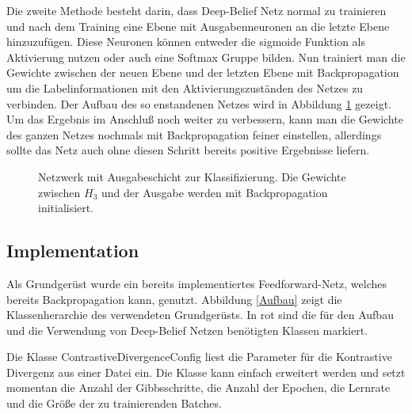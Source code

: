 \documentclass[12pt]{article}
\begin{document}
Die zweite Methode besteht darin, dass Deep-Belief Netz normal zu trainieren und nach dem Training eine Ebene mit Ausgabenneuronen an die letzte Ebene hinzuzufügen. Diese Neuronen können entweder die sigmoide Funktion als Aktivierung nutzen oder auch eine Softmax Gruppe bilden. Nun trainiert man die Gewichte zwischen der neuen Ebene und der letzten Ebene mit Backpropagation um die Labelinformationen mit den Aktivierungszuständen des Netzes zu verbinden. Der Aufbau des so enstandenen Netzes wird in Abbildung \ref{BPTrain} gezeigt. Um das Ergebnis im Anschluß noch weiter zu verbessern, kann man die Gewichte des ganzen Netzes nochmals mit Backpropagation feiner einstellen, allerdings sollte das Netz auch ohne diesen Schritt bereits positive Ergebnisse liefern\cite{backprop}.

\begin{figure}[H]
	\center
	
	\caption{Netzwerk mit Ausgabeschicht zur Klassifizierung. Die Gewichte zwischen $H_3$ und der Ausgabe werden mit Backpropagation initialisiert.}
	\label{BPTrain}
\end{figure}


\subsection{Implementation}
Als Grundgerüst wurde ein bereits implementiertes Feedforward-Netz, welches bereits Backpropagation kann, genutzt. Abbildung \ref{Aufbau} zeigt die Klassenherarchie des verwendeten Grundgerüsts. In rot sind die für den Aufbau und die Verwendung von Deep-Belief Netzen benötigten Klassen markiert.

Die Klasse ContrastiveDivergenceConfig liest die Parameter für die Kontrastive Divergenz aus einer Datei ein. Die Klasse kann einfach erweitert werden und setzt momentan die Anzahl der Gibbsschritte, die Anzahl der Epochen, die Lernrate und die Größe der zu trainierenden Batches.
\end{document}
